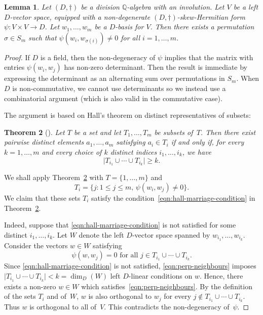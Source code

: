 \documentclass[JEP,XML,SOM,Unicode,NoFloatCountersInSection]{cedram}
\newcommand{\bQ}{\mathbb{Q}}
\newcommand{\abs}[1]{\lvert #1 \rvert}
\newtheorem{lemma}{Lemma}[section]
\newtheorem{theorem}[lemma]{Theorem}
\begin{document}
\begin{lemma} \label{non-zero-permutation}
Let $(D,\dag)$ be a division $\bQ$-algebra with an involution.
Let $V$ be a left $D$\nobreakdash-vector space, equipped with a non-degenerate $(D,\dag)$-skew-Hermitian form \hbox{$\psi \colon V \times V \to D$}.
Let $w_1, \dotsc, w_m$ be a $D$-basis for $V$.
Then there exists a permutation $\sigma \in S_m$ such that
$\psi(w_i, w_{\sigma(i)}) \neq 0$
for all $i = 1, \dotsc, m$.
\end{lemma}

\begin{proof}
If $D$ is a field, then the non-degeneracy of $\psi$ implies that the matrix with entries $\psi(w_i,w_j)$ has non-zero determinant.
Then the result is immediate by expressing the determinant as an alternating sum over permutations in $S_m$.
When $D$ is non-commutative, we cannot use determinants so we instead use a combinatorial argument (which is also valid in the commutative case).

The argument is based on Hall's theorem on distinct representatives of subsets:
\begin{theorem}[\cite{Hal35}] \label{hall-marriage-thm}
Let $T$ be a set and let $T_1, \dotsc, T_m$ be subsets of~$T$.
Then there exist pairwise distinct elements $a_1, \dotsc, a_m$ satisfying $a_i \in T_i$ if and only if, for every $k = 1, \dotsc, m$ and every choice of $k$ distinct indices $i_1, \dotsc, i_k$, we have
\begin{equation} \label{eqn:hall-marriage-condition}
\abs{T_{i_1} \cup \dotsb \cup T_{i_k}} \geq k.
\end{equation}
\end{theorem}

We shall apply Theorem~\ref{hall-marriage-thm} with $T = \{ 1, \dotsc, m \}$ and
\[
T_i = \{ j : 1 \leq j \leq m, \, \psi(w_i, w_j) \neq 0 \}.
\]
We claim that these sets $T_i$ satisfy the condition~\eqref{eqn:hall-marriage-condition} in Theorem~\ref{hall-marriage-thm}.

Indeed, suppose that \eqref{eqn:hall-marriage-condition} is not satisfied for some distinct $i_1, \dotsc, i_k$.
Let $W$ denote the left $D$-vector space spanned by $w_{i_1}, \dotsc, w_{i_k}$.
Consider the vectors $w \in W$ satisfying
\begin{equation} \label{eqn:perp-neighbours}
\psi(w, w_j) = 0 \text{ for all } j \in T_{i_1} \cup \dotsb \cup T_{i_k}.
\end{equation}
Since \eqref{eqn:hall-marriage-condition} is not satisfied, \eqref{eqn:perp-neighbours} imposes $\abs{T_{i_1} \cup \dotsb \cup T_{i_k}} < k = \dim_D(W)$ left $D$-linear conditions on $w$.
Hence, there exists a non-zero $w \in W$ which satisfies~\eqref{eqn:perp-neighbours}.
By the definition of the sets $T_i$ and of~$W$, $w$ is also orthogonal to $w_j$ for every $j \not\in T_{i_1} \cup \dotsb \cup T_{i_k}$.
Thus $w$ is orthogonal to all of~$V$. This contradicts the non-degeneracy of~$\psi$.


\end{proof}
\end{document}
